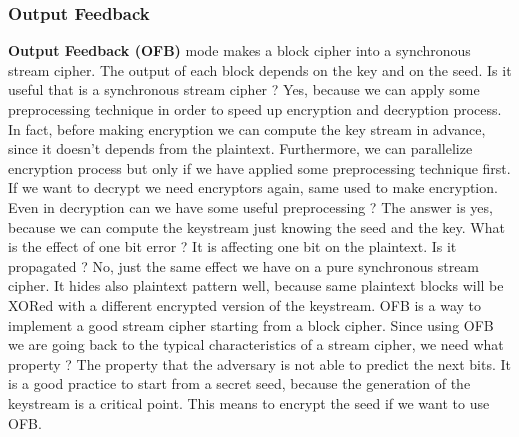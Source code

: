 \documentclass[11pt]{article}
\begin{document}
\subsubsection{Output Feedback}
\textbf{Output Feedback (OFB)} mode makes a block cipher into a synchronous stream cipher. The output of each block depends on the key and on the seed. Is it useful that is a synchronous
stream cipher ? Yes, because we can apply some preprocessing technique in order to speed up encryption and decryption process. In fact, before making encryption we can compute the key stream in advance, since it doesn’t depends from the plaintext. Furthermore, we can parallelize encryption process but only if we have applied some preprocessing technique first. If we want to decrypt we need encryptors again, same used to make encryption. Even in decryption can we have some useful preprocessing ? The answer is yes, because we can compute the keystream just knowing the seed and the key. What is the effect of one bit error ? It is affecting one bit on the plaintext. Is it propagated ? No, just the same effect we have on a pure synchronous stream cipher. It hides also plaintext pattern well, because same plaintext blocks will be XORed with a different encrypted version of the keystream. OFB is a way to implement a good stream cipher starting from a block cipher. Since using OFB we are going back to the typical characteristics of a stream cipher, we need what property ? The property that the adversary is not able to predict the next bits. It is a good practice to start from a secret seed, because the generation of the keystream is a critical point. This means to encrypt the seed if we want to use OFB.
\end{document}
